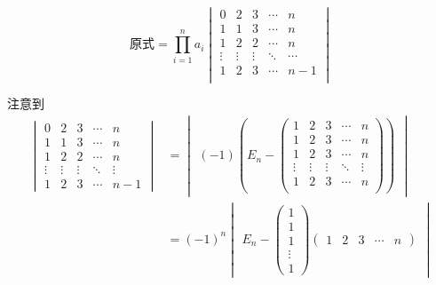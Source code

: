 \begin{solution}
    \[ \text{原式}=\prod_{i=1}^na_i \begin{vmatrix}
        0&2&3&\cdots&n\\
        1&1&3&\cdots&n\\
        1&2&2&\cdots&n\\
        \vdots&\vdots&\vdots&\ddots&\cdots\\
        1&2&3&\cdots&n-1\\
    \end{vmatrix} \]

    注意到
    \begin{align*}
        \begin{vmatrix}
            0&2&3&\cdots&n\\
            1&1&3&\cdots&n\\
            1&2&2&\cdots&n\\
            \vdots&\vdots&\vdots&\ddots&\vdots\\
            1&2&3&\cdots&n-1
        \end{vmatrix} &= \begin{vmatrix}(-1)\left(E_n-
        \begin{pmatrix}
            1&2&3&\cdots&n\\
            1&2&3&\cdots&n\\
            1&2&3&\cdots&n\\
            \vdots&\vdots&\vdots&\ddots&\vdots\\
            1&2&3&\cdots&n\\
            \end{pmatrix}\right)\end{vmatrix}\\
            &=(-1)^n\begin{vmatrix}E_n-
            \begin{pmatrix}
            1\\1\\1\\\vdots\\1
        \end{pmatrix}\begin{pmatrix}1 & 2 & 3 & \cdots & n\end{pmatrix}\end{vmatrix}
    \end{align*}


\end{solution}
